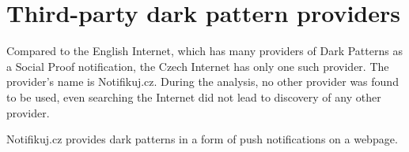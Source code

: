 \section{Third-party dark pattern providers}
Compared to the English Internet, which has many providers of Dark Patterns as a Social Proof notification\cite{dark-patterns-at-scale}, the Czech Internet has only one such provider. The provider's name is Notifikuj.cz. During the analysis, no other provider was found to be used, even searching the Internet did not lead to discovery of any other provider.

Notifikuj.cz provides dark patterns in a form of push notifications on a webpage. 